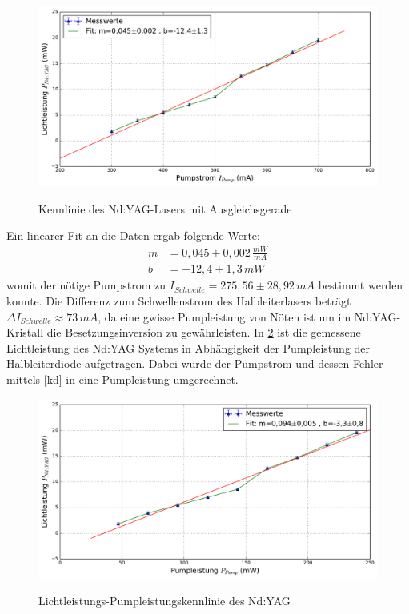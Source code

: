 \documentclass[twoside,colorback,accentcolor=tud4c,11pt]{tudreport}
\begin{document}
\begin{figure}[H]
\centering
   	\begin{minipage}[b]{0.9\textwidth}
   	\includegraphics[width=\textwidth]{graphics/kenn_ndyag_PS.pdf}
  	\label{kenyag}
   	\end{minipage}
\caption{Kennlinie des Nd:YAG-Lasers mit Ausgleichsgerade}	
\end{figure}
Ein linearer Fit an die Daten ergab folgende Werte:
\begin{align}
m&= 0,045\pm 0,002\,\si{\frac{mW}{mA}}\\
b&= -12,4\pm 1,3\,\si{mW}
\end{align}
womit der nötige Pumpstrom zu $I_{Schwelle}=275,56\pm 28,92\,\si{mA}$ bestimmt werden konnte. Die Differenz zum Schwellenstrom des Halbleiterlasers beträgt $\Delta I_{Schwelle}\approx 73\,\si{mA}$, da eine gwisse Pumpleistung von Nöten ist um im Nd:YAG-Kristall die Besetzungsinversion zu gewährleisten. In \ref{kenyag2} ist die gemessene Lichtleistung des Nd:YAG Systems in Abhängigkeit der Pumpleistung der Halbleiterdiode aufgetragen. Dabei wurde der Pumpstrom und dessen Fehler mittels \ref{kd} in eine Pumpleistung umgerechnet.
\begin{figure}[H]
\centering
   	\begin{minipage}[b]{0.9\textwidth}
   	\includegraphics[width=\textwidth]{graphics/kenn_ndyag_pl.pdf}
  	\label{kenyag2}
   	\end{minipage}
\caption{Lichtleistungs-Pumpleistungskennlinie des Nd:YAG}	
\end{figure}
\end{document}
